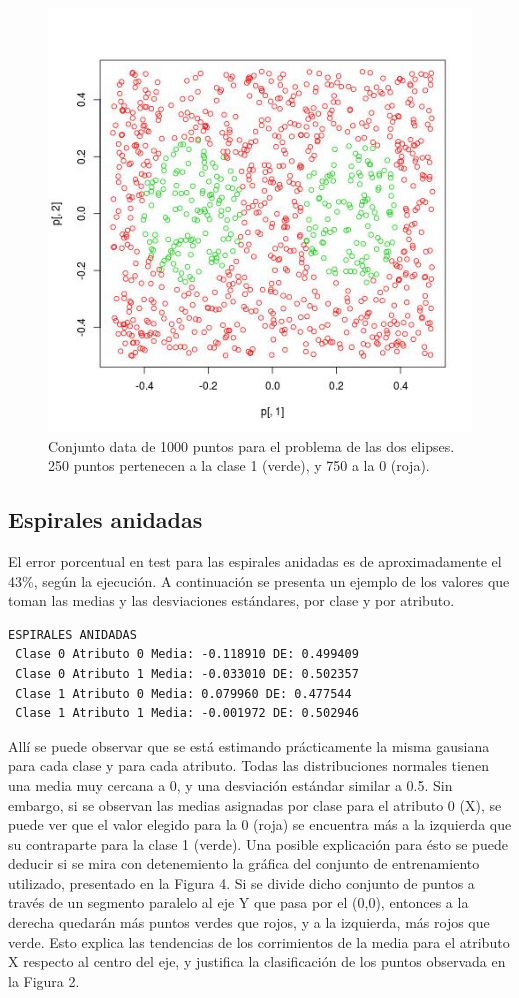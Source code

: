 \documentclass[12pt, a4paper]{article}
\begin{document}
\begin{figure}
    \centering
	\includegraphics[scale=0.45]{dos_elipses}
	\caption{Conjunto data de 1000 puntos para el problema de las dos elipses. 250 puntos pertenecen a la clase 1 (verde), y 750 a la 0 (roja).}
\end{figure}

\bigskip

\subsection*{Espirales anidadas}
El error porcentual en test para las espirales anidadas es de aproximadamente el 43\%, según la ejecución. A continuación se presenta un ejemplo de los valores que toman las medias y las desviaciones estándares, por clase y por atributo. 

\begin{verbatim}
ESPIRALES ANIDADAS
 Clase 0 Atributo 0 Media: -0.118910 DE: 0.499409
 Clase 0 Atributo 1 Media: -0.033010 DE: 0.502357
 Clase 1 Atributo 0 Media: 0.079960 DE: 0.477544
 Clase 1 Atributo 1 Media: -0.001972 DE: 0.502946
\end{verbatim}
Allí se puede observar que se está estimando prácticamente la misma gausiana para cada clase y para cada atributo. Todas las distribuciones normales tienen una media muy cercana a 0, y una desviación estándar similar a 0.5. Sin embargo, si se observan las medias asignadas por clase para el atributo 0 (X), se puede ver que el valor elegido para la 0 (roja) se encuentra más a la izquierda que su contraparte para la clase 1 (verde). Una posible explicación para ésto se puede deducir si se mira con detenemiento la gráfica del conjunto de entrenamiento utilizado, presentado en la Figura 4. Si se divide dicho conjunto de puntos a través de un segmento paralelo al eje Y que pasa por el (0,0), entonces a la derecha quedarán más puntos verdes que rojos, y a la izquierda, más rojos que verde. Esto explica las tendencias de los corrimientos de la media para el atributo X respecto al centro del eje, y justifica la clasificación de los puntos observada en la Figura 2.
\end{document}
